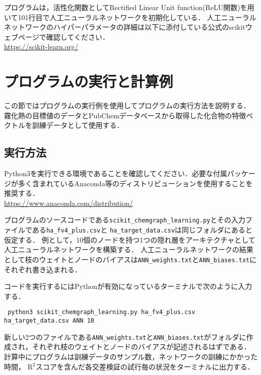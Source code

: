 \documentclass[11pt,titlepage,dvipdfmx,twoside]{jarticle}
\begin{document}
プログラムは，活性化関数としてRectified Linear Unit function(ReLU関数)を用いて101行目で人工ニューラルネットワークを初期化している．
人工ニューラルネットワークのハイパーパラメータの詳細は以下に添付している公式のscikitウェブページで確認してください．
\\

\url{https://scikit-learn.org/}




\newpage

\section{プログラムの実行と計算例}
\label{sec:section5}

この節ではプログラムの実行例を使用してプログラムの実行方法を説明する．
霧化熱の目標値のデータとPubChemデータベースから取得した化合物の特徴ベクトルを訓練データとして使用する．

\subsection{実行方法}
\label{sec:section5_1}

Python3を実行できる環境であることを確認してください．必要な付属パッケージが多く含まれているAnaconda等のディストリビューションを使用することを推奨する．
\\
\url{https://www.anaconda.com/distribution/}

プログラムのソースコードである\verb|scikit_chemgraph_learning.py|とその入力ファイルである\verb|ha_fv4_plus.csv|と \verb|ha_target_data.csv|は同じフォルダにあると仮定する．
例として，10個のノードを持つ1つの隠れ層をアーキテクチャとして人工ニューラルネットワークを構築する．
人工ニューラルネットワークの結果として枝のウェイトとノードのバイアスは\verb|ANN_weights.txt|と\verb|ANN_biases.txt|にそれぞれ書き込まれる．

コードを実行するにはPythonが有効になっているターミナルで次のように入力する．
\begin{verbatim}
 python3 scikit_chemgraph_learning.py ha_fv4_plus.csv ha_target_data.csv ANN 10
\end{verbatim}

新しい2つのファイルである\verb|ANN_weights.txt|と\verb|ANN_biases.txt|がフォルダに作成され，それぞれ枝のウェイトとノードのバイアスが記述されるはずである．
計算中にプログラムは訓練データのサンプル数，ネットワークの訓練にかかった時間， R$^2$スコアを含んだ各交差検証の試行毎の状況をターミナルに出力する．
\end{document}
